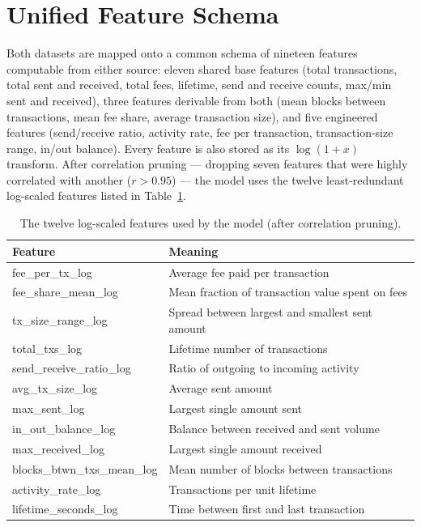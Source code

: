 \documentclass[12pt,a4paper,openany]{report}
\begin{document}
\section{Unified Feature Schema}
Both datasets are mapped onto a common schema of nineteen features computable from either
source: eleven shared base features (total transactions, total sent and received, total fees,
lifetime, send and receive counts, max/min sent and received), three features derivable from
both (mean blocks between transactions, mean fee share, average transaction size), and five
engineered features (send/receive ratio, activity rate, fee per transaction, transaction-size
range, in/out balance). Every feature is also stored as its $\log(1+x)$ transform. After
correlation pruning --- dropping seven features that were highly correlated with another
($r>0.95$) --- the model uses the twelve least-redundant log-scaled features listed in
Table~\ref{tab:features}.

\begin{table}[H]
\centering\small
\caption{The twelve log-scaled features used by the model (after correlation pruning).}
\label{tab:features}
\renewcommand{\arraystretch}{1.15}
\begin{tabularx}{\linewidth}{>{\ttfamily\footnotesize\raggedright\arraybackslash}p{5.6cm} >{\raggedright\arraybackslash}X}
\toprule
\normalfont\bfseries Feature & \textbf{Meaning} \\
\midrule
fee\_per\_tx\_log          & Average fee paid per transaction \\
fee\_share\_mean\_log      & Mean fraction of transaction value spent on fees \\
tx\_size\_range\_log       & Spread between largest and smallest sent amount \\
total\_txs\_log            & Lifetime number of transactions \\
send\_receive\_ratio\_log  & Ratio of outgoing to incoming activity \\
avg\_tx\_size\_log         & Average sent amount \\
max\_sent\_log             & Largest single amount sent \\
in\_out\_balance\_log      & Balance between received and sent volume \\
max\_received\_log         & Largest single amount received \\
blocks\_btwn\_txs\_mean\_log & Mean number of blocks between transactions \\
activity\_rate\_log        & Transactions per unit lifetime \\
lifetime\_seconds\_log     & Time between first and last transaction \\
\bottomrule
\end{tabularx}
\end{table}
\end{document}
